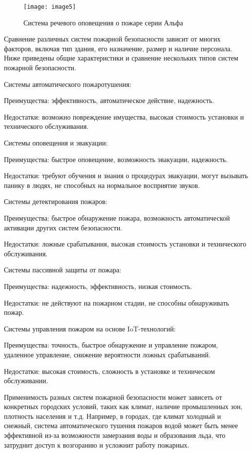 \begin{figure}[H]
  \centering
  \texttt{[image: image5]}
  \caption{Система речевого оповещения о пожаре серии Альфа}
\end{figure}

\begin{multicols}{2}

Сравнение различных систем пожарной безопасности зависит от многих
факторов, включая тип здания, его назначение, размер и наличие
персонала. Ниже приведены общие характеристики и сравнение нескольких
типов систем пожарной безопасности.

Системы автоматического пожаротушения:

Преимущества: эффективность, автоматическое действие, надежность.

Недостатки: возможно повреждение имущества, высокая стоимость установки
и технического обслуживания.

Системы оповещения и эвакуации:

Преимущества: быстрое оповещение, возможность эвакуации, надежность.

Недостатки: требуют обучения и знания о процедурах эвакуации, могут
вызывать панику в людях, не способных на нормальное восприятие звуков.

Системы детектирования пожаров:

Преимущества: быстрое обнаружение пожара, возможность автоматической
активации других систем безопасности.

Недостатки: ложные срабатывания, высокая стоимость установки и
технического обслуживания.

Системы пассивной защиты от пожара:

Преимущества: надежность, эффективность, низкая стоимость.

Недостатки: не действуют на пожарном стадии, не способны обнаруживать
пожар.

Системы управления пожаром на основе IoT-технологий:

Преимущества: точность, быстрое обнаружение и управление пожаром,
удаленное управление, снижение вероятности ложных срабатываний.

Недостатки: высокая стоимость, сложность в установке и техническом
обслуживании.

Применимость разных систем пожарной безопасности может зависеть от
конкретных городских условий, таких как климат, наличие промышленных
зон, плотность населения и т.д. Например, в городах, где климат холодный
и снежный, система автоматического тушения пожаров водой может быть
менее эффективной из-за возможности замерзания воды и образования льда,
что затруднит доступ к возгоранию и усложнит работу пожарных.


\end{multicols}
